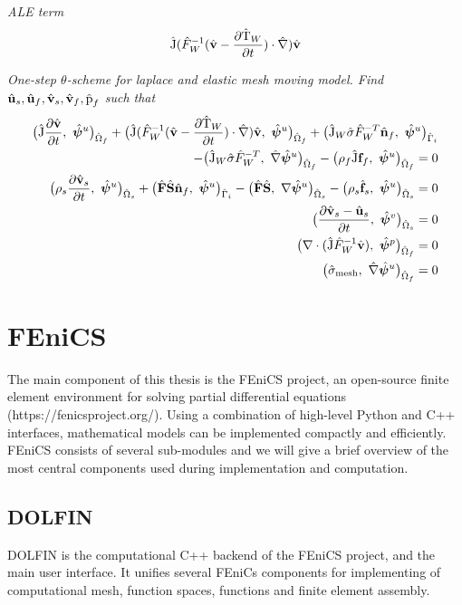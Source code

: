                  
\begin{prob}
\textit{ALE term}\begin{align*}
\text{\^{J}} (\hat{F}_W^{-1}(\hat{\mathbf{v}} - \frac{\partial \text{\^{T}}_W}{\partial t}) \cdot \hat{\nabla}) \hat{\mathbf{v}}
\end{align*} 
\end{prob}


\begin{prob}
\textit{One-step $\theta$-scheme for laplace and elastic mesh moving model.
Find $\hat{\mathbf{u}}_s, \hat{\mathbf{u}}_f, \hat{\mathbf{v}}_s, \hat{\mathbf{v}}_f, \text{\^{p}}_f $ such that}
\begin{align*}
\big(\text{\^{J}} \frac{\partial \hat{\mathbf{v}}}{\partial t}, \ \hat{\bm{\psi}}^u \big)_{\hat{\Omega}_f} +
\big(\text{\^{J}} (\hat{F}_W^{-1}(\hat{\mathbf{v}} - \frac{\partial \text{\^{T}}_W}{\partial t}) \cdot \hat{\nabla}) \hat{\mathbf{v}}, \ {\hat{\bm{\psi}}^u} \big)_{\hat{\Omega}_f}
+ \big(\text{\^{J}}_W \hat{\sigma}\hat{F}_W^{-T} \hat{\mathbf{n}}_f, \ {\hat{\bm{\psi}}^u} \big)_{\hat{\Gamma}_i} \\
- \big(\text{\^{J}}_W \hat{\sigma}\hat{F}_W^{-T}, \ {\hat{\nabla}\hat{\bm{\psi}}^u} \big)_{\hat{\Omega}_f} -
\big(\rho_f \text{\^{J}} \mathbf{f}_f, \ {{\hat{\bm{\psi}}^u}} \big)_{\hat{\Omega}_f} = 0 \\
\big(\rho_s \frac{\partial \hat{\mathbf{v}}_s}{\partial t}, \ {\hat{\bm{\psi}}^u} \big)_{\hat{\Omega}_s} + \big(\hat{\mathbf{F}}\hat{\mathbf{S}}\hat{\mathbf{n}}_f, \ {\hat{\bm{\psi}}^u} \big)_{\hat{\Gamma}_i}
- \big(\hat{\mathbf{F}}\hat{\mathbf{S}}, \ {\nabla \hat{\bm{\psi}}^u} \big)_{\hat{\Omega}_s} - \big(\rho_s \hat{\mathbf{f}}_s, \ {\hat{\bm{\psi}}^u} \big)_{\hat{\Omega}_s} = 0 \\
\big(\frac{\partial \hat{\mathbf{v}}_s - \hat{\mathbf{u}}_s}{\partial t}, \ {\hat{\bm{\psi}}^v} \big)_{\hat{\Omega}_s}  = 0\\
\big(\nabla \cdot (\text{\^{J}} \hat{F}_W^{-1} \hat{\mathbf{v}}), \ {\hat{\bm{\psi}}^p} \big)_{\hat{\Omega}_f} = 0 \\
\big(\hat{\sigma}_{\text{mesh}}, \ {\hat{\nabla}\hat{\bm{\psi}}^u} \big)_{\hat{\Omega}_f} = 0
\end{align*} 
\end{prob}


\section{FEniCS}
The main component of this thesis is the FEniCS project, an open-source finite element environment for solving partial differential equations (https://fenicsproject.org/). Using a combination of high-level Python and C++ interfaces, mathematical models can be implemented compactly and efficiently. FEniCS consists of several sub-modules and we will give a brief overview of the most central components used during implementation and computation.

\subsection{DOLFIN}
DOLFIN is the computational C++ backend of the FEniCS project, and the main user interface. It unifies several FEniCs components for implementing of computational mesh, function spaces, functions and finite element assembly. 

